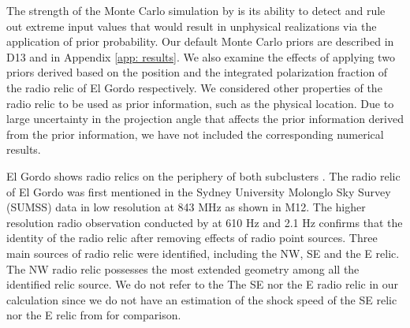 The strength of the Monte Carlo simulation by  is its ability
to detect and rule out extreme input values that would result in
unphysical realizations via the application of prior probability. 
Our default Monte Carlo priors are described in D13 and in Appendix
\ref{app: results}. We also examine the effects of applying 
two priors derived based on the position and the integrated polarization
fraction of the radio relic of El Gordo respectively. 
We considered other properties of the radio relic to be used as prior
information, such as the physical location. Due to large uncertainty in the
projection angle that affects the prior information derived from the prior
information, we have not included the corresponding numerical results.
\par 
El Gordo shows radio relics on the periphery of both subclusters
. The
radio relic  of El Gordo was first mentioned in the Sydney University
Molonglo Sky Survey (SUMSS) data in low resolution at 843 MHz
\citep{Mauch03} as shown in M12. The higher resolution radio observation
conducted by \cite{L13} at 610 \mega Hz and 2.1 \giga Hz confirms that the identity of the radio relic
after removing effects of radio point sources. 
Three main sources of radio relic were identified, including the NW, SE and the
E relic. The NW radio relic possesses the most extended geometry among all
the identified relic source. We do not refer to the The SE nor the E radio
relic in our calculation since we do not have an estimation of the shock
speed of the SE relic nor the E relic from \citet{L13} for comparison.    


